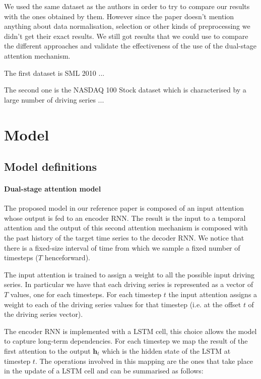 \documentclass{article}
\begin{document}
We used the same dataset as the authors in order to try to compare our results
with the ones obtained by them. However
since the paper doesn't mention anything about data normalisation, selection or
other kinds of preprocessing we didn't
get their exact results. We still got results that we could use to compare the
different approaches and validate the
effectiveness of the use of the dual-stage attention mechanism.

The first dataset is SML 2010 ...

The second one is the NASDAQ 100 Stock dataset which is characterised by a
large number of driving series ...


\section{Model}
\label{sec:model}

\subsection{Model definitions}
\paragraph{Dual-stage attention model}

The proposed model in our reference paper is composed of an input attention
whose output is fed to an encoder RNN. The
result is the input to a temporal attention and the output of this second
attention mechanism is composed with the
past history of the target time series to the decoder RNN. We notice that there
is a fixed-size interval of time from
which we sample a fixed number of timesteps ($T$ henceforward).

The input attention is trained to assign a weight to all the possible input
driving series. In particular we have
that each driving series is represented as a vector of $T$ values, one for each
timesteps. For each timestep $t$ the
input attention assigns a weight to each of the driving series values for that
timestep (i.e. at the offset $t$ of the
driving series vector).

The encoder RNN is implemented with a LSTM cell, this choice allows the model
to capture long-term dependencies.
For each timestep we map the result of the first attention to the output
$\mathbf{h}_t$ which is the hidden state of
the LSTM at timestep $t$. The operations involved in this mapping are the ones
that take place in the update of a LSTM
cell and can be summarised as follows:
\end{document}
